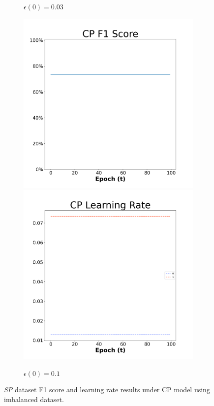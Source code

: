 \begin{figure}[H]
\begin{subfigure}{0.3\textwidth}
  \caption{$\epsilon(0)=0.03$}
\end{subfigure}\hfil %
\begin{subfigure}{0.3\textwidth}
  \includegraphics[width=\linewidth]{images/exper2/SP/CP_0.1_f1.png}
  \includegraphics[width=\linewidth]{images/exper2/SP/CP_0.1_lr.png}
  \caption{$\epsilon(0)=0.1$}
\end{subfigure}

\caption{\textit{SP} dataset F1 score and learning rate results under CP model using imbalanced dataset.}
\end{figure}

